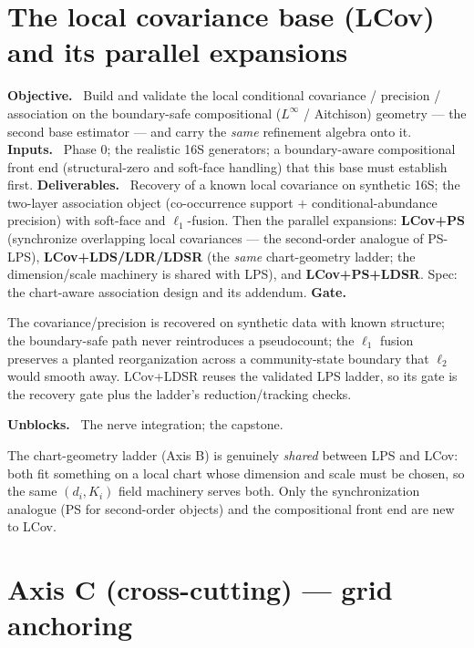 \documentclass[11pt]{article}
\newcommand{\field}[1]{\smallskip\noindent\textbf{\textsf{#1.}}\ }
\begin{document}
\section{The local covariance base (LCov) and its parallel expansions}\label{sec:lcov}

\field{Objective} Build and validate the local conditional covariance / precision /
association on the boundary-safe compositional ($L^\infty$ / Aitchison) geometry ---
the second base estimator --- and carry the \emph{same} refinement algebra onto it.
\field{Inputs} Phase 0; the realistic 16S generators; a boundary-aware compositional
front end (structural-zero and soft-face handling) that this base must establish
first.
\field{Deliverables} Recovery of a known local covariance on synthetic 16S; the
two-layer association object (co-occurrence support $+$ conditional-abundance
precision) with soft-face and $\ell_1$-fusion. Then the parallel expansions:
\textbf{LCov+PS} (synchronize overlapping local covariances --- the second-order
analogue of PS-LPS), \textbf{LCov+LDS/LDR/LDSR} (the \emph{same} chart-geometry
ladder; the dimension/scale machinery is shared with LPS), and \textbf{LCov+PS+LDSR}.
Spec: the chart-aware association design and its addendum.
\field{Gate} \begin{gate} The covariance/precision is recovered on synthetic data
with known structure; the boundary-safe path never reintroduces a pseudocount; the
$\ell_1$ fusion preserves a planted reorganization across a community-state boundary
that $\ell_2$ would smooth away. LCov+LDSR reuses the validated LPS ladder, so its
gate is the recovery gate plus the ladder's reduction/tracking checks.\end{gate}
\field{Unblocks} The nerve integration; the capstone.

\begin{note}
The chart-geometry ladder (Axis B) is genuinely \emph{shared} between LPS and LCov:
both fit something on a local chart whose dimension and scale must be chosen, so the
same $(d_i,K_i)$ field machinery serves both. Only the synchronization analogue (PS
for second-order objects) and the compositional front end are new to LCov.
\end{note}

\section{Axis C (cross-cutting) --- grid anchoring}\label{sec:grid}
\end{document}
